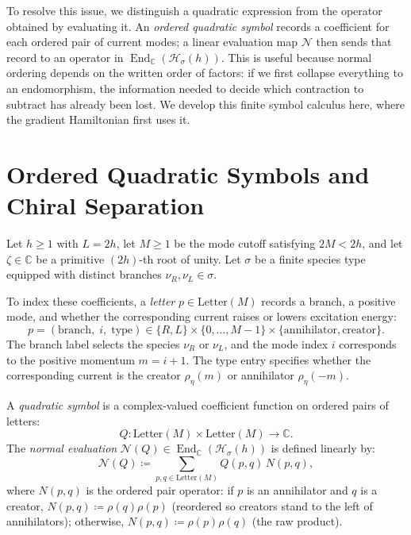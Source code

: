 To resolve this issue, we distinguish a quadratic expression from the operator obtained by evaluating it. An \emph{ordered quadratic symbol} records a coefficient for each ordered pair of current modes; a linear evaluation map $\mathcal{N}$ then sends that record to an operator in $\operatorname{End}_{\mathbb{C}}(\mathcal{H}_\sigma(h))$. This is useful because normal ordering depends on the written order of factors: if we first collapse everything to an endomorphism, the information needed to decide which contraction to subtract has already been lost. We develop this finite symbol calculus here, where the gradient Hamiltonian first uses it.

\section{Ordered Quadratic Symbols and Chiral Separation}

Let $h \ge 1$ with $L = 2h$, let $M \ge 1$ be the mode cutoff satisfying $2M < 2h$, and let $\zeta \in \mathbb{C}$ be a primitive $(2h)$-th root of unity. Let $\sigma$ be a finite species type equipped with distinct branches $\nu_R, \nu_L \in \sigma$.

To index these coefficients, a \emph{letter} $p \in \mathrm{Letter}(M)$ records a branch, a positive mode, and whether the corresponding current raises or lowers excitation energy:
\begin{equation}
p = (\mathrm{branch},\; i,\; \mathrm{type}) \in \{R,L\} \times \{0, \dots, M-1\} \times \{\mathrm{annihilator},\mathrm{creator}\}.
\end{equation}
The branch label selects the species $\nu_R$ or $\nu_L$, and the mode index $i$ corresponds to the positive momentum $m=i+1$. The type entry specifies whether the corresponding current is the creator $\rho_\eta(m)$ or annihilator $\rho_\eta(-m)$.

A \emph{quadratic symbol} is a complex-valued coefficient function on ordered pairs of letters:
\begin{equation}
Q : \mathrm{Letter}(M) \times \mathrm{Letter}(M) \to \mathbb{C}.
\end{equation}
The \emph{normal evaluation} $\mathcal{N}(Q) \in \operatorname{End}_{\mathbb{C}}(\mathcal{H}_\sigma(h))$ is defined linearly by:
\begin{equation}
\mathcal{N}(Q) \coloneqq \sum_{p, q \in \mathrm{Letter}(M)} Q(p, q)\, N(p, q),
\end{equation}
where $N(p, q)$ is the ordered pair operator: if $p$ is an annihilator and $q$ is a creator, $N(p, q) \coloneqq \rho(q) \rho(p)$ (reordered so creators stand to the left of annihilators); otherwise, $N(p, q) \coloneqq \rho(p) \rho(q)$ (the raw product).

